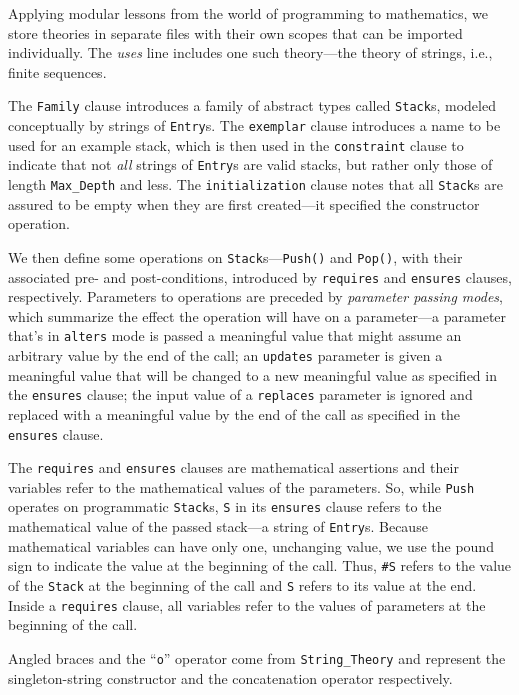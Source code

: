 Applying modular lessons from the world of programming to mathematics, we store theories in separate files with their own scopes that can be imported individually\cite{smith08}.  The \emph{uses} line includes one such theory---the theory of strings, i.e., finite sequences.

The \texttt{Family} clause introduces a family of abstract types called \texttt{Stack}s, modeled conceptually by strings of \texttt{Entry}s.  The \texttt{exemplar} clause introduces a name to be used for an example stack, which is then used in the \texttt{constraint} clause to indicate that not \emph{all} strings of \texttt{Entry}s are valid stacks, but rather only those of length \texttt{Max\_Depth} and less.  The \texttt{initialization} clause notes that all \texttt{Stack}s are assured to be empty when they are first created---it specified the constructor operation.

We then define some operations on \texttt{Stack}s---\texttt{Push()} and \texttt{Pop()}, with their associated pre- and post-conditions, introduced by \texttt{requires} and \texttt{ensures} clauses, respectively.  Parameters to operations are preceded by \emph{parameter passing modes}, which summarize the effect the operation will have on a parameter---a parameter that's in \texttt{alters} mode is passed a meaningful value that might assume  an arbitrary value by the end of the call; an \texttt{updates} parameter is given a meaningful value that will be changed to a new meaningful value as specified in the \texttt{ensures} clause;  the input value of a \texttt{replaces} parameter is ignored and replaced with a meaningful value by the end of the call as specified in the \texttt{ensures} clause.

The \texttt{requires} and \texttt{ensures} clauses are mathematical assertions and their variables refer to the mathematical values of the parameters.  So, while \texttt{Push} operates on programmatic \texttt{Stack}s, \texttt{S} in its \texttt{ensures} clause refers to the mathematical value of the passed stack---a string of \texttt{Entry}s.  Because mathematical variables can have only one, unchanging value, we use the pound sign to indicate the value at the beginning of the call.  Thus, \texttt{\#S} refers to the value of the \texttt{Stack} at the beginning of the call and \texttt{S} refers to its value at the end.  Inside a \texttt{requires} clause, all variables refer to the values of parameters at the beginning of the call.

Angled braces and the ``\texttt{o}'' operator come from \texttt{String\_Theory} and represent the singleton-string constructor and the concatenation operator respectively.

